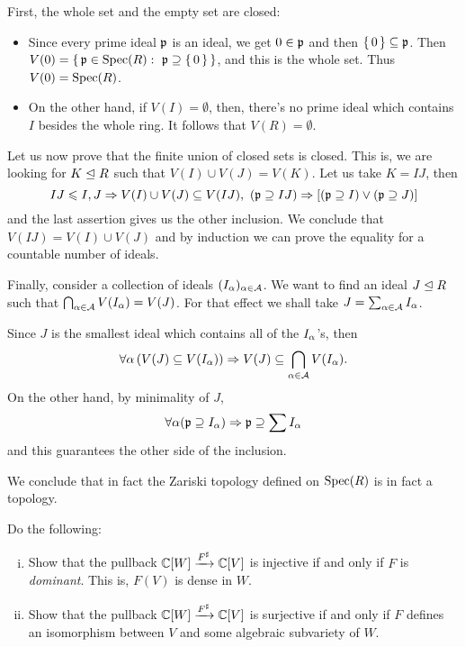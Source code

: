 \documentclass[12pt]{memoir}
\begin{document}
\begin{ptcbr}
  First, the whole set and the empty set are closed:
  \begin{itemize}
    \itemsep=-0.4em
    \item Since every prime ideal $\mathfrak{p}$ is an ideal, we get $0\in\mathfrak{p}$ and then $\{\,0\,\}\subseteq \mathfrak{p}$. Then $V(0)=\{\,\mathfrak{p}\in\operatorname{Spec}(R):\ \mathfrak{p}\supseteq \{\,0\,\}\,\}$, and this is the whole set. Thus $V(0)=\operatorname{Spec}(R)$.
    \item On the other hand, if $V(I)=\emptyset$, then, there's no prime ideal which contains $I$ besides the whole ring. It follows that $V(R)=\emptyset$.
  \end{itemize}
  Let us now prove that the finite union of closed sets is closed. This is, we are looking for $K\trianglelefteq R$ such that $V(I)\cup V(J)=V(K)$. Let us take $K=IJ$, then 
  $$IJ\leqslant I,J\Rightarrow V(I)\cup V(J)\subseteq V(IJ),\ (\mathfrak{p}\supseteq IJ)\Rightarrow[(\mathfrak{p}\supseteq I)\lor(\mathfrak{p}\supseteq J)]$$
  and the last assertion gives us the other inclusion. We conclude that $V(IJ)=V(I)\cup V(J)$ and by induction we can prove the equality for a countable number of ideals.\par 
  Finally, consider a collection of ideals $(I_\alpha)_{\alpha\in\mathcal{A}}$. We want to find an ideal $J\trianglelefteq R$ such that $\bigcap_{\alpha\in\mathcal{A}}V(I_\alpha)=V(J)$. For that effect we shall take $J=\sum_{\alpha\in\mathcal{A}}I_\alpha$.\par
  Since $J$ is the smallest ideal which contains all of the $I_\alpha$'s, then 
  $$\forall\alpha\left(V(J)\subseteq V(I_\alpha)\right)\Rightarrow V(J)\subseteq \bigcap_{\alpha\in\mathcal{A}}V(I_\alpha).$$
  On the other hand, by minimality of $J$, 
  $$\forall\alpha(\mathfrak{p}\supseteq I_\alpha)\Rightarrow\mathfrak{p}\supseteq \sum I_\alpha$$
  and this guarantees the other side of the inclusion.\par 
  We conclude that in fact the Zariski topology defined on $\operatorname{Spec}(R)$ is in fact a topology.
\end{ptcbr}

\begin{Ej}[2.5.(1,2)]
  Do the following:
  \begin{enumerate}[i)]
    \itemsep=-0.4em
    \item Show that the pullback $\mathbb{C}[W]\xrightarrow{F^\sharp}\mathbb{C}[V]$ is injective if and only if $F$ is \emph{dominant}. This is, $F(V)$ is dense in $W$.
    \item Show that the pullback $\mathbb{C}[W]\xrightarrow{F^\sharp}\mathbb{C}[V]$ is surjective if and only if $F$ defines an isomorphism between $V$ and some algebraic subvariety of $W$.
     
  \end{enumerate}
 \end{Ej}
\end{document}
